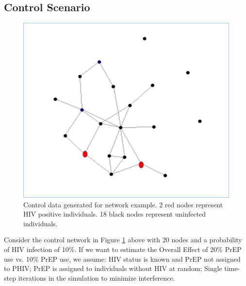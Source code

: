 \documentclass{article}
\theoremstyle{definition}
\begin{document}
\subsection{Control Scenario}
\begin{figure}[H]
    \centering
    \includegraphics[scale=0.5]{Network Example 1.png}
    \caption{Control data generated for network example. 2 red nodes represent HIV positive individuals. 18 black nodes represent uninfected individuals.}
    \label{fig: Figure 2}
\end{figure}
Consider the control network in Figure \ref{fig: Figure 2}  above with 20 nodes and a probability of HIV infection of 10\%. If we want to estimate the Overall Effect of 20\% PrEP use vs. 10\% PrEP use, we assume: HIV status is known and PrEP not assigned to PHIV; PrEP is assigned to individuals without HIV at random; Single time-step iterations in the simulation to minimize interference.
\end{document}
